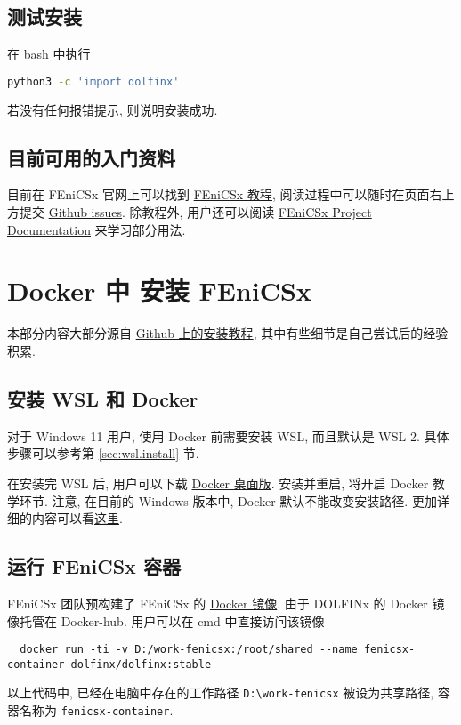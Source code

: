 \documentclass[fontset=founder]{ctexrep}
\begin{document}
\section{测试安装}

在 \textsf{bash} 中执行
\begin{lstlisting}[language = bash]
  python3 -c 'import dolfinx'
\end{lstlisting}
若没有任何报错提示,
则说明安装成功.

\section{目前可用的入门资料}

目前在 FEniCSx 官网上可以找到
\href{https://jsdokken.com/dolfinx-tutorial/}{FEniCSx 教程},
阅读过程中可以随时在页面右上方提交 \href{https://github.com/jorgensd/dolfinx-tutorial/issues/new?title=Issue%20on%20page%20%2Findex.html&body=Your%20issue%20content%20here.}{Github issues}.
除教程外,
用户还可以阅读
\href{https://docs.fenicsproject.org/}{FEniCSx Project Documentation}
来学习部分用法.

\chapter{Docker 中 安装 FEniCSx}

本部分内容大部分源自 \href{https://github.com/FEniCS/dolfinx#docker-images}{Github 上的安装教程},
其中有些细节是自己尝试后的经验积累.

\section{安装 WSL 和 Docker}

对于 Windows 11 用户,
使用 Docker 前需要安装 WSL,
而且默认是 WSL 2.
具体步骤可以参考第 \ref{sec:wsl.install} 节.

在安装完 WSL 后,
用户可以下载 \href{https://www.docker.com/get-started}{Docker 桌面版}.
安装并重启,
将开启 Docker 教学环节.
注意,
在目前的 Windows 版本中,
Docker 默认不能改变安装路径.
更加详细的内容可以看\href{https://docs.docker.com/desktop/windows/install/}{这里}.

\section{运行 FEniCSx 容器}

FEniCSx 团队预构建了 FEniCSx 的 \href{https://hub.docker.com/u/dolfinx}{Docker 镜像}.
由于 DOLFINx 的 Docker 镜像托管在 Docker-hub.
用户可以在 \textsf{cmd} 中直接访问该镜像
\begin{lstlisting}
  docker run -ti -v D:/work-fenicsx:/root/shared --name fenicsx-container dolfinx/dolfinx:stable
\end{lstlisting}
以上代码中,
已经在电脑中存在的工作路径 \texttt{D:\textbackslash work-fenicsx} 被设为共享路径,
容器名称为 \texttt{fenicsx-container}.
\end{document}
